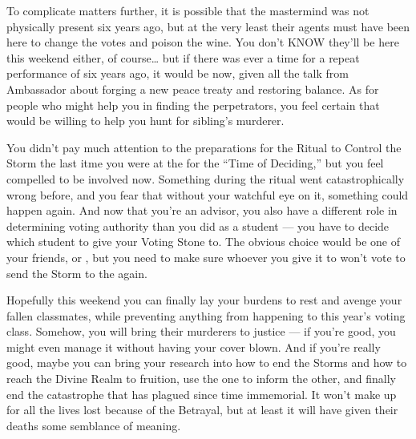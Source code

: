 \documentclass[char]{GL2020}
\begin{document}
To complicate matters further, it is possible that the mastermind was not physically present six years ago, but at the very least their agents must have been here to change the votes and poison the wine. You don't KNOW they'll be here this weekend either, of course\ldots{} but if there was ever a time for a repeat performance of six years ago, it would be now, given all the talk from Ambassador \cHeadDiplomat{\intro} about forging a new peace treaty and restoring balance. As for people who might help you in finding the perpetrators, you feel certain that \cHeir{} would be willing to help you hunt for \cHeir{\their} sibling’s murderer. 

You didn't pay much attention to the preparations for the Ritual to Control the Storm the last itme you were at the \pSc{} for the ``Time of Deciding,'' but you feel compelled to be involved now. Something during the ritual went catastrophically wrong before, and you fear that without your watchful eye on it, something could happen again. And now that you're an advisor, you also have a different role in determining voting authority than you did as a student — you have to decide which student to give your Voting Stone to. The obvious choice would be one of your friends, \cHeir{} or \cTechStar{}, but you need to make sure whoever you give it to won’t vote to send the Storm to the \pShippies{} again. 

Hopefully this weekend you can finally lay your burdens to rest and avenge your fallen classmates, while preventing anything from happening to this year's voting class. Somehow, you will bring their murderers to justice — if you're good, you might even manage it without having your cover blown. And if you’re really good, maybe you can bring your research into how to end the Storms and how to reach the Divine Realm to fruition, use the one to inform the other, and finally end the catastrophe that has plagued \pEarth{} since time immemorial. It won’t make up for all the lives lost because of the Betrayal, but at least it will have given their deaths some semblance of meaning. 
\end{document}
